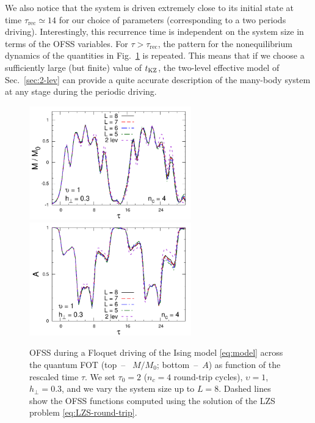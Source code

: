 We also notice that the system is driven extremely close to its initial state at time $\tau_\text{rec}\simeq 14$ for our choice of parameters (corresponding to a two periods driving).  Interestingly, this recurrence time is independent on the system size in terms of the OFSS variables. For $\tau>\tau_\text{rec}$, the pattern for the nonequilibrium dynamics of the quantities in Fig.~\ref{fig:Floquet-M+A} is repeated. This means that if we choose a sufficiently large (but finite) value of $t_{\rm KZ}$, the two-level effective model of Sec.~\ref{sec:2-lev} can provide a quite accurate description of the many-body system at any stage during the periodic driving. 
\\
\begin{figure}[t]
\centering
\includegraphics[width=7cm]{imm/Mt2nc4u1g03.pdf}
\includegraphics[width=7cm]{imm/At2nc4u1g03.pdf}
\caption{OFSS during a Floquet driving of the Ising model \eqref{eq:model} across the quantum FOT (top~--~ $M/M_0$; bottom~--~$A$) as function of the rescaled time $\tau$. We set $\tau_0=2$ ($n_c=4$ round-trip cycles), $\upsilon=1$, $h_\perp=0.3$, and we vary the system size up to $L=8$. Dashed lines show the OFSS functions computed using the solution of the LZS problem \eqref{eq:LZS-round-trip}.}\label{fig:Floquet-M+A}
\end{figure}
